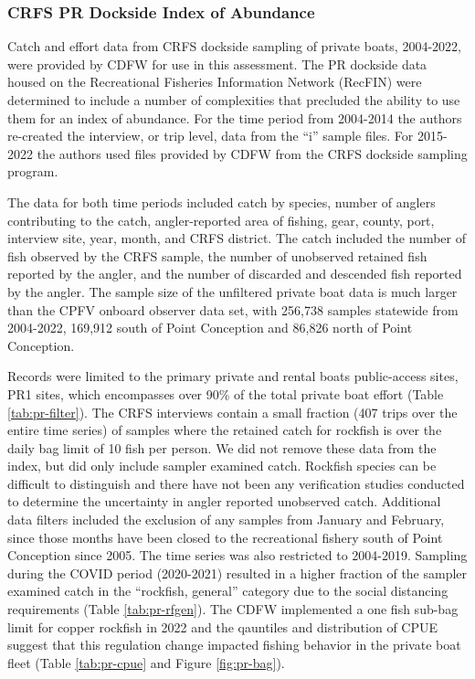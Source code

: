 \documentclass[
  letterpaper,
]{article}
\author{true \and true \and true}
\date{}
\begin{document}
{
\setcounter{tocdepth}{2}
\tableofcontents
}
\linenumbers

\newcommand\CapeM{$40^\circ 10^\prime$ N. lat.}
\newcommand\PtC{$34^\circ 27^\prime$ N. lat.}
\newcommand\CAOR{$42^\circ 00^\prime$ N. lat.}

\hypertarget{crfs-pr-index}{%
\subsubsection{CRFS PR Dockside Index of Abundance}\label{crfs-pr-index}}

Catch and effort data from CRFS dockside sampling of private boats, 2004-2022,
were provided by CDFW for use in this assessment. The PR dockside data housed
on the Recreational Fisheries Information Network (RecFIN) were
determined to include a number of complexities that precluded the ability to
use them for an index of abundance. For the time period from 2004-2014 the authors
re-created the interview, or trip level, data from the ``i'' sample files. For 2015-2022
the authors used files provided by CDFW from the CRFS dockside sampling program.

The data for both time periods included catch by species, number of anglers contributing to the catch, angler-reported area of fishing,
gear, county, port, interview site, year, month, and CRFS district. The catch included
the number of fish observed by the CRFS sample, the number of unobserved retained fish reported
by the angler, and the number of discarded and descended fish reported by the angler.
The sample size of the
unfiltered private boat data is much larger than the CPFV onboard observer data set,
with 256,738 samples statewide from 2004-2022, 169,912 south
of Point Conception and 86,826 north of Point Conception.

Records were limited to the primary private and rental boats public-access sites,
PR1 sites, which encompasses over 90\% of the total private boat effort
(Table \ref{tab:pr-filter}). The CRFS interviews contain a small fraction
(407 trips over the entire time series) of samples where the retained catch for
rockfish is over the daily bag limit of 10
fish per person. We did not remove these data from the index, but did
only include sampler examined catch. Rockfish species can be difficult to distinguish and there
have not been any verification studies conducted to determine the uncertainty in angler reported
unobserved catch.
Additional data filters included the exclusion of any samples from January and
February, since those months have been closed to the recreational fishery south of Point
Conception since 2005. The time series was also restricted to 2004-2019. Sampling during the
COVID period (2020-2021) resulted in a higher fraction of the sampler examined catch in the
``rockfish, general''
category due to the social distancing requirements (Table \ref{tab:pr-rfgen}). The CDFW
implemented a one fish sub-bag
limit for copper rockfish in 2022 and the qauntiles and distribution of CPUE suggest that this
regulation change impacted fishing behavior in the private boat fleet (Table \ref{tab:pr-cpue} and
Figure \ref{fig:pr-bag}).
\end{document}
